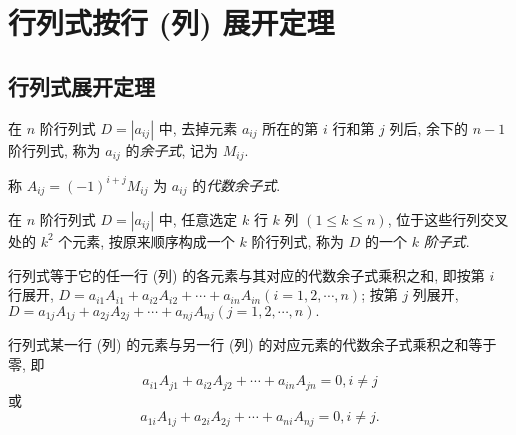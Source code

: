 \section{行列式按行 (列) 展开定理}

\subsection{行列式展开定理}

\begin{definition}[余子式]
    在 $ n $ 阶行列式 $ D=\left|a_{i j}\right| $ 中, 去掉元素 $ a_{i j} $ 所在的第 $ i $ 行和第 $ j $ 列后, 余下的 $ n-1 $ 阶行列式, 称为 $ a_{i j} $ 的\textit{余子式}, 记为 $ M_{i j} .$
\end{definition}
\begin{definition}[代数余子式]
    称 $ A_{i j}=(-1)^{i+j} M_{i j} $ 为 $ a_{i j} $ 的\textit{代数余子式}.
\end{definition}
\begin{definition}[$ k $ 阶子式]
    在 $ n $ 阶行列式 $ D=\left|a_{i j}\right| $ 中, 任意选定 $ k $ 行 $ k $ 列 $ (1 \leqslant k \leqslant n) $, 
    位于这些行列交叉处的 $ k^{2} $ 个元素, 按原来顺序构成一个 $ k $ 阶行列式, 称为 $ D $ 的一个 $ k $ \textit{阶子式}.
\end{definition}
\begin{theorem}[按行 (列) 展开]
    行列式等于它的任一行 (列) 的各元素与其对应的代数余子式乘积之和, 即按第 $ i $ 行展开, $D=a_{i 1} A_{i 1}+a_{i 2} A_{i 2}+\cdots+a_{i n} A_{i n}(i=1,2, \cdots, n) $;
    按第 $ j $ 列展开, $D=a_{1 j} A_{1 j}+a_{2 j} A_{2 j}+\cdots+a_{n j} A_{n j}(j=1,2, \cdots, n) .$

    行列式某一行 (列) 的元素与另一行 (列) 的对应元素的代数余子式乘积之和等于零, 即
    $$a_{i 1} A_{j 1}+a_{i 2} A_{j 2}+\cdots+a_{i n} A_{j n}=0, i \neq j$$
    或
    $$a_{1 i} A_{1 j}+a_{2 i} A_{2 j}+\cdots+a_{n i} A_{n j}=0, i \neq j .$$
\end{theorem}

